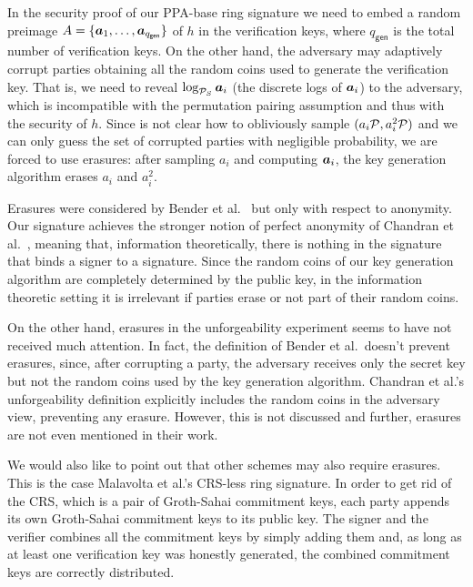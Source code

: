 
\label{sect:erasures}
In the security proof of our PPA-base ring signature we need to embed a random preimage $A=\{{\boldsymbol{a}}_1,\ldots,\allowbreak {\boldsymbol{a}}_{q_{\mathsf{gen}}}\}$ of $h$ in the verification keys, where $q_{\mathsf{gen}}$ is the total number of verification keys. On the other hand, the adversary may adaptively corrupt parties obtaining all the random coins used to generate the verification key. That is, we need to reveal $\log_{\mathcal{P}_S} {\boldsymbol{a}}_i$ (the discrete logs of ${\boldsymbol{a}}_i$) to the adversary, which is incompatible with the permutation pairing assumption and thus with the security of $h$. Since is not clear how to obliviously sample $(a_i\mathcal{P},a^2_i\mathcal{P})$ and we can only guess the set of corrupted parties with negligible probability, we are forced to use erasures: after sampling $a_i$ and computing ${\boldsymbol{a}}_i$, the key generation algorithm erases $a_i$ and $a_i^2$.

Erasures were considered by Bender et al.~\cite{TCC:BenKatMor06} but only with respect to anony\-mity. Our signature achieves the stronger notion of perfect anonymity of Chandran et al.~\cite{ICALP:ChaGroSah07}, meaning that, information theoretically, there is nothing in the signature that binds a signer to a signature. Since the random coins of our key generation algorithm are completely determined by the public key, in the information theoretic setting it is irrelevant if parties erase or not part of their random coins.

On the other hand, erasures in the unforgeability experiment seems to have not received much attention. In fact, the definition of Bender et al.~doesn't prevent erasures, since, after corrupting a party, the adversary receives only the secret key but not the random coins used by the key generation algorithm.  Chandran et al.'s unforgeability definition explicitly includes the random coins in the adversary view, preventing any erasure. However, this is not discussed and further, erasures are not even mentioned in their work.

We would also like to point out that other schemes may also require erasures. This is the case Malavolta et al.'s CRS-less ring signature. In order to get rid of the CRS, which is a pair of Groth-Sahai commitment keys, each party appends its own Groth-Sahai commitment keys to its public key. The signer and the verifier combines all the commitment keys by simply adding them and, as long as at least one verification key was honestly generated, the combined commitment keys are correctly distributed.

